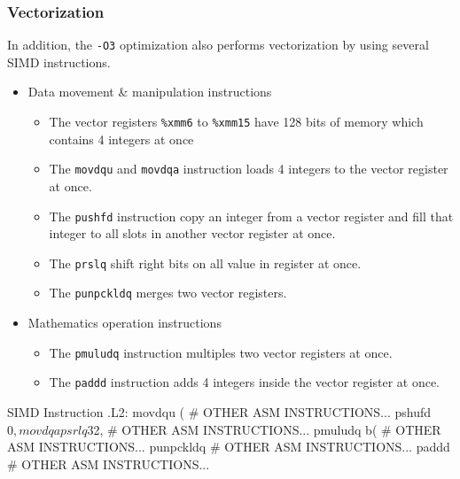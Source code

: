 \documentclass[12pt, a4paper]{article}
\begin{document}
            \subsubsection{Vectorization}
                In addition, the \texttt{-O3} optimization also performs vectorization by using several SIMD instructions.
                \begin{itemize}
                    \item Data movement \& manipulation instructions
                    \begin{itemize}
                        \item The vector registers \texttt{\%xmm6} to \texttt{\%xmm15} have 128 bits of memory
                        which contains 4 integers at once
                        \item The \texttt{movdqu} and \texttt{movdqa} instruction loads 4 integers to the vector register at once.
                        \item The \texttt{pushfd} instruction copy an integer from a vector register and
                        fill that integer to all slots in another vector register at once.
                        \item The \texttt{prslq} shift right bits on all value in register at once.
                        \item The \texttt{punpckldq} merges two vector registers.
                    \end{itemize}
                    \item Mathematics operation instructions
                    \begin{itemize}
                        \item The \texttt{pmuludq} instruction multiples two vector registers at once.
                        \item The \texttt{paddd} instruction adds 4 integers inside the vector register at once.
                    \end{itemize}
                \end{itemize}
                \begin{codeblock}[minted language=asm]{SIMD Instruction}
                    .L2:
                        movdqu  (%
                        # OTHER ASM INSTRUCTIONS...
                        pshufd  $0, %
                        movdqa  %
                        psrlq   $32, %
                        # OTHER ASM INSTRUCTIONS...
                        pmuludq b(%
                        # OTHER ASM INSTRUCTIONS...
                        punpckldq    %
                        # OTHER ASM INSTRUCTIONS...
                        paddd    %
                        # OTHER ASM INSTRUCTIONS...
                \end{codeblock}
\end{document}
